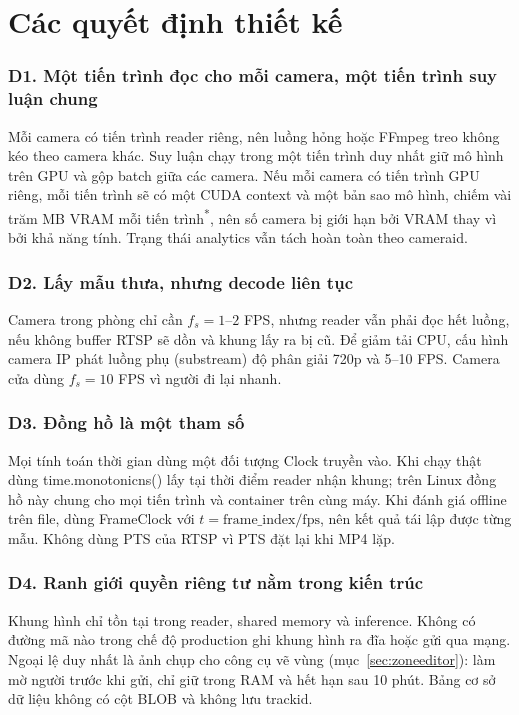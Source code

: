 \documentclass[10pt,a4paper,oneside,openany]{report}
\newcommand{\breakus}{\textunderscore\allowbreak}
\newcommand{\code}[1]{{\ttfamily\let\_\breakus #1}}
\newcommand{\uoc}{\textsuperscript{\textcolor{warn}{*}}}  %
\begin{document}
\section{Các quyết định thiết kế}

\subsubsection{D1. Một tiến trình đọc cho mỗi camera, một tiến trình suy luận chung}
Mỗi camera có tiến trình reader riêng, nên luồng hỏng hoặc FFmpeg treo không kéo theo camera khác. Suy luận chạy trong một tiến trình
duy nhất giữ mô hình trên GPU và gộp batch giữa các camera. Nếu mỗi camera có tiến trình GPU riêng, mỗi tiến trình sẽ có một CUDA
context và một bản sao mô hình, chiếm vài trăm MB VRAM mỗi tiến trình\uoc, nên số camera bị giới hạn bởi VRAM thay vì bởi khả năng tính.
Trạng thái analytics vẫn tách hoàn toàn theo \code{camera\_id}.

\subsubsection{D2. Lấy mẫu thưa, nhưng decode liên tục}
Camera trong phòng chỉ cần $f_s = 1$--$2$ FPS, nhưng reader vẫn phải đọc hết luồng, nếu không buffer RTSP sẽ dồn và khung lấy ra
bị cũ. Để giảm tải CPU, cấu hình camera IP phát luồng phụ (substream) độ phân giải 720p và 5--10 FPS. Camera cửa dùng $f_s = 10$ FPS
vì người đi lại nhanh.

\subsubsection{D3. Đồng hồ là một tham số}
Mọi tính toán thời gian dùng một đối tượng \code{Clock} truyền vào. Khi chạy thật dùng \code{time.monotonic\_ns()} lấy tại thời điểm reader
nhận khung; trên Linux đồng hồ này chung cho mọi tiến trình và container trên cùng máy. Khi đánh giá offline trên file, dùng
\code{FrameClock} với $t = \text{frame\_index}/\text{fps}$, nên kết quả tái lập được từng mẫu. Không dùng PTS của RTSP vì PTS
đặt lại khi MP4 lặp.

\subsubsection{D4. Ranh giới quyền riêng tư nằm trong kiến trúc}
Khung hình chỉ tồn tại trong reader, shared memory và inference. Không có đường mã nào trong chế độ production ghi khung hình ra đĩa
hoặc gửi qua mạng. Ngoại lệ duy nhất là ảnh chụp cho công cụ vẽ vùng (mục~\ref{sec:zoneeditor}): làm mờ người trước khi gửi, chỉ giữ trong
RAM và hết hạn sau 10 phút. Bảng cơ sở dữ liệu không có cột BLOB và không lưu \code{track\_id}.
\end{document}
